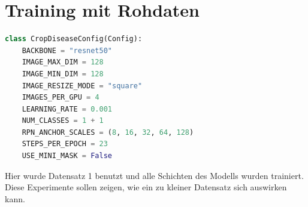 \section{Training mit Rohdaten}\label{sub:sub:sec:experiment-1}

\begin{lstlisting}[language=python,caption={Konfiguration für Experimente 1},captionpos=b]
class CropDiseaseConfig(Config):
    BACKBONE = "resnet50"
    IMAGE_MAX_DIM = 128
    IMAGE_MIN_DIM = 128
    IMAGE_RESIZE_MODE = "square"
    IMAGES_PER_GPU = 4
    LEARNING_RATE = 0.001
    NUM_CLASSES = 1 + 1
    RPN_ANCHOR_SCALES = (8, 16, 32, 64, 128)
    STEPS_PER_EPOCH = 23
    USE_MINI_MASK = False
\end{lstlisting}
\noindent
Hier wurde Datensatz 1 benutzt und alle Schichten des Modells wurden trainiert. Diese Experimente sollen zeigen, wie ein zu kleiner Datensatz sich auswirken kann.

